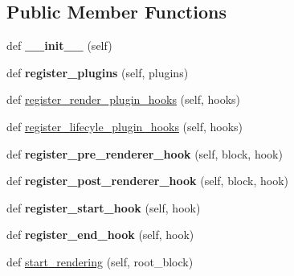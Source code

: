 \subsection*{Public Member Functions}
\begin{DoxyCompactItemize}
\item 
\hypertarget{classtexla_1_1Renderers_1_1Renderer_1_1Renderer_ad7b2d2ad9bd47d4ca6e01efdd9f794bd}{}\label{classtexla_1_1Renderers_1_1Renderer_1_1Renderer_ad7b2d2ad9bd47d4ca6e01efdd9f794bd} 
def {\bfseries \+\_\+\+\_\+init\+\_\+\+\_\+} (self)
\item 
\hypertarget{classtexla_1_1Renderers_1_1Renderer_1_1Renderer_aa65e78017d10f6ccaacf0dffcd009668}{}\label{classtexla_1_1Renderers_1_1Renderer_1_1Renderer_aa65e78017d10f6ccaacf0dffcd009668} 
def {\bfseries register\+\_\+plugins} (self, plugins)
\item 
def \hyperlink{classtexla_1_1Renderers_1_1Renderer_1_1Renderer_ab2a50912d83684b9cd57fc4feccedad6}{register\+\_\+render\+\_\+plugin\+\_\+hooks} (self, hooks)
\item 
def \hyperlink{classtexla_1_1Renderers_1_1Renderer_1_1Renderer_aa5ac1cc3c4e118189bd4497ed03564dd}{register\+\_\+lifecyle\+\_\+plugin\+\_\+hooks} (self, hooks)
\item 
\hypertarget{classtexla_1_1Renderers_1_1Renderer_1_1Renderer_aaea86a5a1ed0006da6fde82f716bfebe}{}\label{classtexla_1_1Renderers_1_1Renderer_1_1Renderer_aaea86a5a1ed0006da6fde82f716bfebe} 
def {\bfseries register\+\_\+pre\+\_\+renderer\+\_\+hook} (self, block, hook)
\item 
\hypertarget{classtexla_1_1Renderers_1_1Renderer_1_1Renderer_a4cedb88a4c46f5a01e2f16b7d432e485}{}\label{classtexla_1_1Renderers_1_1Renderer_1_1Renderer_a4cedb88a4c46f5a01e2f16b7d432e485} 
def {\bfseries register\+\_\+post\+\_\+renderer\+\_\+hook} (self, block, hook)
\item 
\hypertarget{classtexla_1_1Renderers_1_1Renderer_1_1Renderer_a347b7e0aa8e3040911e038fe916c329d}{}\label{classtexla_1_1Renderers_1_1Renderer_1_1Renderer_a347b7e0aa8e3040911e038fe916c329d} 
def {\bfseries register\+\_\+start\+\_\+hook} (self, hook)
\item 
\hypertarget{classtexla_1_1Renderers_1_1Renderer_1_1Renderer_a87c47afda693254e1e6ffaaea96e018b}{}\label{classtexla_1_1Renderers_1_1Renderer_1_1Renderer_a87c47afda693254e1e6ffaaea96e018b} 
def {\bfseries register\+\_\+end\+\_\+hook} (self, hook)
\item 
def \hyperlink{classtexla_1_1Renderers_1_1Renderer_1_1Renderer_a2f95c5cc5ea76c75cb5ee79df01f43f2}{start\+\_\+rendering} (self, root\+\_\+block)

\end{DoxyCompactItemize}
